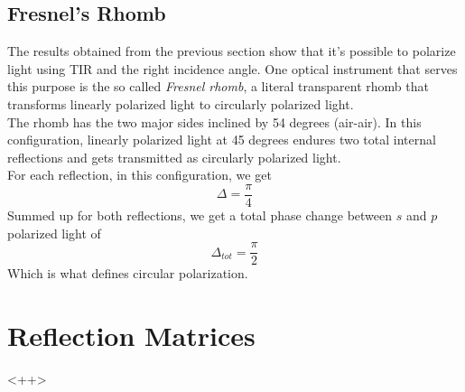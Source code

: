 \documentclass[../electromagnetism.tex]{subfiles}
\begin{document}
\subsection{Fresnel's Rhomb}
The results obtained from the previous section show that it's possible to polarize light using TIR and the right incidence angle. One optical instrument that serves this purpose is the so called \textit{Fresnel rhomb}, a literal transparent rhomb that transforms linearly polarized light to circularly polarized light.\\
The rhomb has the two major sides inclined by 54 degrees (air-air). In this configuration, linearly polarized light at 45 degrees endures two total internal reflections and gets transmitted as circularly polarized light.\\
For each reflection, in this configuration, we get
\begin{equation*}
	\Delta=\frac{\pi}{4}
\end{equation*}
Summed up for both reflections, we get a total phase change between $s$ and $p$ polarized light of
\begin{equation*}
	\Delta_{tot}=\frac{\pi}{2}
\end{equation*}
Which is what defines circular polarization.
\section{Reflection Matrices}
<++>
\end{document}
